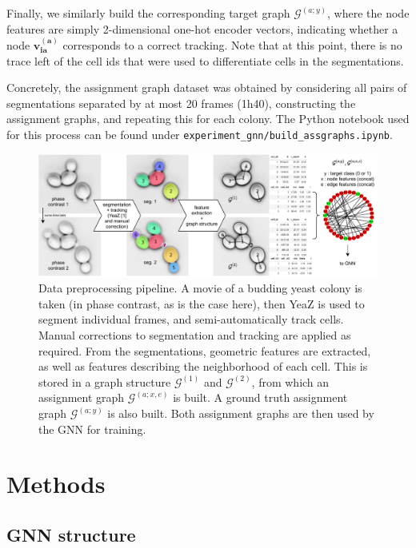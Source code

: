 \documentclass[10pt,conference,compsocconf,a4paper]{IEEEtran}
\newcommand{\G}{\mathcal{G}}
\renewcommand{\vec}[1]{\boldsymbol{#1}}
\begin{document}
		Finally, we similarly build the corresponding target graph $\G^{(a;y)}$, where the node features are simply 2-dimensional one-hot encoder vectors, indicating whether a node $\vec{v_{ia}^{(a)}}$ corresponds to a correct tracking. Note that at this point, there is no trace left of the cell ids that were used to differentiate cells in the segmentations.

		Concretely, the assignment graph dataset was obtained by considering all pairs of segmentations separated by at most 20 frames (1h40), constructing the assignment graphs, and repeating this for each colony. The Python notebook used for this process can be found under \texttt{experiment\_gnn/build\_assgraphs.ipynb}.

		\begin{figure}
			\centering
			\includegraphics[width=\linewidth]{figures/pipeline.pdf}
			\caption{Data preprocessing pipeline. A movie of a budding yeast colony is taken (in phase contrast, as is the case here), then YeaZ \cite{dietler_convolutional_2020} is used to segment individual frames, and semi-automatically track cells. Manual corrections to segmentation and tracking are applied as required. From the segmentations, geometric features are extracted, as well as features describing the neighborhood of each cell. This is stored in a graph structure $\G^{(1)}$ and $\G^{(2)}$, from which an assignment graph $\G^{(a;x,e)}$ is built. A ground truth assignment graph $\G^{(a;y)}$ is also built. Both assignment graphs are then used by the GNN for training.}
			\label{fig:pipeline}
		\end{figure}


\section{Methods}

	\subsection{GNN structure}
\end{document}
